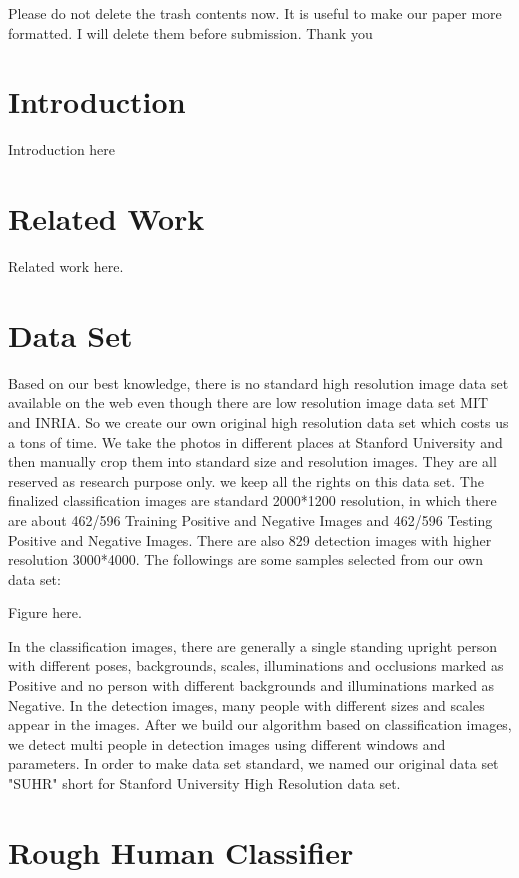 \documentclass[10pt,twocolumn,letterpaper]{article}
\begin{document}
Please do not delete the trash contents now. It is useful to make our paper more formatted. I will delete them before submission. Thank you
\section{Introduction}
Introduction here
\section{Related Work}
Related work here.
\section{Data Set}
Based on our best knowledge, there is no standard high resolution image data set available on the web even though there are
low resolution image data set MIT and INRIA. So we create our own original high resolution data set which costs us a tons of time.
We take the photos in different places at Stanford University and then manually crop them into standard size and resolution images. They are all reserved as research purpose only. we keep all the rights on this data set. The finalized classification images are standard 2000*1200 resolution, in which there are about 462/596 Training Positive and Negative Images and 462/596 Testing Positive and Negative Images. There are also 829 detection images with higher resolution 3000*4000. The followings are some samples selected from our own data set:

Figure here.

In the classification images, there are generally a single standing upright person with different poses, backgrounds, scales, illuminations and occlusions marked as Positive and no person with different backgrounds and illuminations marked as Negative. In the detection images, many people with different sizes and scales appear in the images. After we build our algorithm based on classification images, we detect multi people in detection images using different windows and parameters. In order to make data set standard, we named our original data set "SUHR" short for Stanford University High Resolution data set.

\section{Rough Human Classifier}
\end{document}

